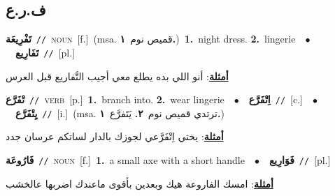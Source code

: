 \documentclass[10pt,a4paper,twoside]{article} %
\begin{document}
\begin{multicols}{2}
\vspace{-3mm}
\subsection*{\color{blue}\foreignlanguage{arabic}{ف.ر.ع}\color{blue}{}} 

{\setlength\topsep{0pt}\textbf{\foreignlanguage{arabic}{تَفْرِيعَة}}\ {\color{gray}\texttt{//}\color{black}}\ \textsc{noun}\ [f.]\ \color{gray}(msa. \foreignlanguage{arabic}{قميص نوم}~\foreignlanguage{arabic}{\textbf{١.}})\color{black}\ \textbf{1.}~night dress.  \textbf{2.}~lingerie\ \ $\bullet$\ \ \setlength\topsep{0pt}\textbf{\foreignlanguage{arabic}{تَفَارِيع}}\ {\color{gray}\texttt{//}\color{black}}\ [pl.]\  \begin{flushright}\color{gray}\foreignlanguage{arabic}{\textbf{\underline{\foreignlanguage{arabic}{أمثلة}}}: أنو اللي بده يطلع معي أجيب التَّفاريع قبل العرس}\end{flushright}\color{black}} \vspace{2mm}

{\setlength\topsep{0pt}\textbf{\foreignlanguage{arabic}{تْفَرَّع}}\ {\color{gray}\texttt{//}\color{black}}\ \textsc{verb}\ [p.]\ \textbf{1.}~branch into.  \textbf{2.}~wear lingerie\ \ $\bullet$\ \ \setlength\topsep{0pt}\textbf{\foreignlanguage{arabic}{اِتْفَرَّع}}\ {\color{gray}\texttt{//}\color{black}}\ [c.]\ \ $\bullet$\ \ \setlength\topsep{0pt}\textbf{\foreignlanguage{arabic}{يِتْفَرَّع}}\ {\color{gray}\texttt{//}\color{black}}\ [i.]\ \color{gray}(msa. \foreignlanguage{arabic}{ترتدي قميص نوم}~\foreignlanguage{arabic}{\textbf{٢.}}  \foreignlanguage{arabic}{يَتَفرَّع}~\foreignlanguage{arabic}{\textbf{١.}})\color{black}\  \begin{flushright}\color{gray}\foreignlanguage{arabic}{\textbf{\underline{\foreignlanguage{arabic}{أمثلة}}}: يختي اِتْفَرَّعي لجوزك بالدار لساتكم عرسان جدد}\end{flushright}\color{black}} \vspace{2mm}

{\setlength\topsep{0pt}\textbf{\foreignlanguage{arabic}{فَارُوعَة}}\ {\color{gray}\texttt{//}\color{black}}\ \textsc{noun}\ [f.]\ \textbf{1.}~a small axe with a short handle\ \ $\bullet$\ \ \setlength\topsep{0pt}\textbf{\foreignlanguage{arabic}{فَوَارِيع}}\ {\color{gray}\texttt{//}\color{black}}\ [pl.]\  \begin{flushright}\color{gray}\foreignlanguage{arabic}{\textbf{\underline{\foreignlanguage{arabic}{أمثلة}}}: امسك الفاروعة هيك وبعدين بأقوى ماعندك اضربها عالخشب}\end{flushright}\color{black}} \vspace{2mm}


\end{multicols}
\end{document}
